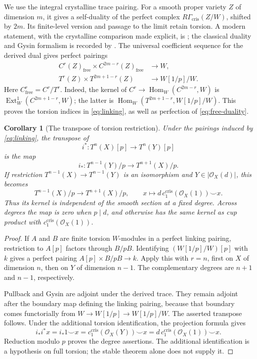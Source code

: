 \documentclass[11pt]{article}
\newtheorem{corollary}[theorem]{Corollary}
\theoremstyle{remark}\newtheorem{remark}[theorem]{Remark}
\newcommand{\OO}{\mathcal O}
\newcommand{\cris}{\mathrm{cris}}
\begin{document}
We use the integral crystalline trace pairing. For a smooth proper variety $Z$ of dimension $m$, it gives a self-duality of the perfect complex $R\Gamma_{\cris}(Z/W)$, shifted by $2m$. Its finite-level version and passage to the limit retain torsion. A modern statement, with the crystalline comparison made explicit, is \citet[Theorem~6.4 and Remark~6.6, p.~2362]{Tang}; the classical duality and Gysin formalism is recorded by \citet[\S2.4, p.~56]{Illusie}. The universal coefficient sequence for the derived dual gives perfect pairings
\begin{align}
 C^r(Z)_{\mathrm{free}}\times C^{2m-r}(Z)_{\mathrm{free}}
 &\longrightarrow W,\label{eq:free-duality}\\
 T^r(Z)\times T^{2m+1-r}(Z)&\longrightarrow W[1/p]/W.
 \label{eq:linking}
\end{align}
Here $C^r_{\mathrm{free}}=C^r/T^r$. Indeed, the kernel of
$C^r\to\operatorname{Hom}_W(C^{2m-r},W)$ is
$\operatorname{Ext}^1_W(C^{2m+1-r},W)$; the latter is
$\operatorname{Hom}_W(T^{2m+1-r},W[1/p]/W)$. This proves the torsion indices in \eqref{eq:linking}, as well as perfection of \eqref{eq:free-duality}.

\begin{corollary}[The transpose of torsion restriction]\label{cor:transpose}
Under the pairings induced by \eqref{eq:linking}, the transpose of
\[
 i^*:T^n(X)[p]\longrightarrow T^n(Y)[p]
\]
is the map
\[
 i_*:T^{n-1}(Y)/p\longrightarrow T^{n+1}(X)/p.
\]
If restriction $T^{n-1}(X)\to T^{n-1}(Y)$ is an isomorphism and
$Y\in|\OO_X(d)|$, this becomes
\[
 T^{n-1}(X)/p\longrightarrow T^{n+1}(X)/p,
 \qquad x\longmapsto d\,c_1^{\cris}(\OO_X(1))\smile x.
\]
Thus its kernel is independent of the smooth section at a fixed degree. Across degrees the map is zero when $p\mid d$, and otherwise has the same kernel as cup product with $c_1^{\cris}(\OO_X(1))$.
\end{corollary}
\begin{proof}
If $A$ and $B$ are finite torsion $W$-modules in a perfect linking pairing, restriction to $A[p]$ factors through $B/pB$. Identifying $(W[1/p]/W)[p]$ with $k$ gives a perfect pairing $A[p]\times B/pB\to k$. Apply this with $r=n$, first on $X$ of dimension $n$, then on $Y$ of dimension $n-1$. The complementary degrees are $n+1$ and $n-1$, respectively.

Pullback and Gysin are adjoint under the derived trace. They remain adjoint after the boundary map defining the linking pairing, because that boundary comes functorially from $W\to W[1/p]\to W[1/p]/W$. The asserted transpose follows. Under the additional torsion identification, the projection formula gives
\[
 i_*i^*x=i_*1\smile x=c_1^{\cris}(\OO_X(Y))\smile x
             =d\,c_1^{\cris}(\OO_X(1))\smile x.
\]
Reduction modulo $p$ proves the degree assertions. The additional identification is a hypothesis on full torsion; the stable theorem alone does not supply it.
\end{proof}
\end{document}
